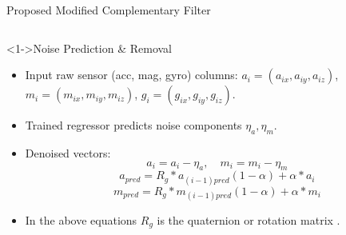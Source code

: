 \documentclass[aspectratio=169,xcolor=dvipsnames]{beamer}
\begin{document}
\begin{frame}{Proposed Modified Complementary Filter}
\scriptsize
\begin{columns}[T]
  \begin{column}{0.48\textwidth}
    \begin{block}<1->{{Noise Prediction \& Removal} \cite{brossard2020openloopCNN}}
      \begin{itemize}[<+->]
        \item Input raw sensor (acc, mag, gyro) columns: 
          $a_i=(a_{ix},a_{iy},a_{iz})$, 
          $m_i=(m_{ix},m_{iy},m_{iz})$, 
          $g_i=(g_{ix},g_{iy},g_{iz})$.
        \item Trained regressor predicts noise components $\eta_a,\eta_m$.
        \item Denoised vectors:
          \[
            a_i = a_i - \eta_a,\quad
            m_i = m_i - \eta_m 
          \]
          \[
            a_{\textit{pred}} = R_g*a_{(i-1)pred}(1-\alpha) + \alpha*a_i
          \]
          \[
            m_{\textit{pred}} = R_g*m_{(i-1)pred}(1-\alpha) + \alpha*m_i
          \]
        \item In the above equations $R_{g}$ is the quaternion or rotation matrix \cite{black1964passive}\cite{cariow2016hardware}.
      \end{itemize}
    \end{block}
  \end{column}
\end{columns}
\end{frame}
\end{document}
